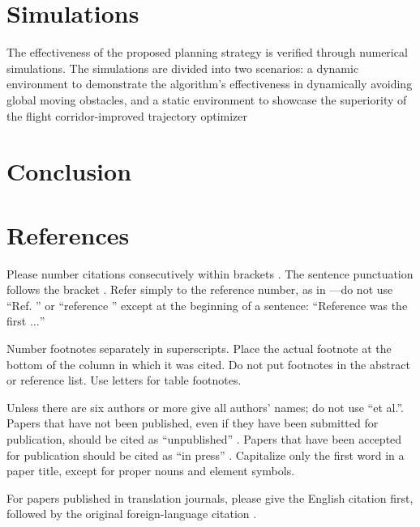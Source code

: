 \documentclass[conference]{IEEEtran}
\begin{document}
    \section{Simulations}
    \label{sec4}
    The effectiveness of the proposed planning strategy is verified through numerical simulations. The simulations are divided into two scenarios: a dynamic environment to demonstrate the algorithm's effectiveness in dynamically avoiding global moving obstacles, and a static environment to showcase the superiority of the flight corridor-improved trajectory optimizer


    \section{Conclusion}
    \label{sec5}


    \section*{References}

    Please number citations consecutively within brackets \cite{b1}. The 
    sentence punctuation follows the bracket \cite{b2}. Refer simply to the reference 
    number, as in \cite{b3}---do not use ``Ref. \cite{b3}'' or ``reference \cite{b3}'' except at 
    the beginning of a sentence: ``Reference \cite{b3} was the first $\ldots$''

    Number footnotes separately in superscripts. Place the actual footnote at 
    the bottom of the column in which it was cited. Do not put footnotes in the 
    abstract or reference list. Use letters for table footnotes.

    Unless there are six authors or more give all authors' names; do not use 
    ``et al.''. Papers that have not been published, even if they have been 
    submitted for publication, should be cited as ``unpublished'' \cite{b4}. Papers 
    that have been accepted for publication should be cited as ``in press'' \cite{b5}. 
    Capitalize only the first word in a paper title, except for proper nouns and 
    element symbols.

    For papers published in translation journals, please give the English 
    citation first, followed by the original foreign-language citation \cite{b6}.
\end{document}

